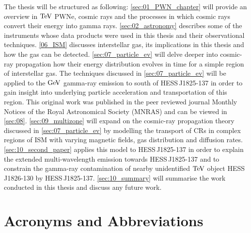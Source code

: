 The thesis will be structured as following:
\autoref{sec:01_PWN_chapter} will provide an overview in $\TeV$ PWNe, cosmic rays and the processes in which cosmic rays convert their energy into gamma rays. \autoref{sec:02_astronomy} describes some of the instruments whose data products were used in this thesis and their observational techniques. \autoref{06_ISM} discusses interstellar gas, its implications in this thesis and how the gas can be detected. \autoref{sec:07_particle_ev} will delve deeper into cosmic-ray propagation how their energy distribution evolves in time for a simple region of interstellar gas. The techniques discussed in \autoref{sec:07_particle_ev} will be applied to the $\si{\giga\electronvolt}$ gamma-ray emission to south of \mbox{HESS\,J1825-137} in order to gain insight into underlying particle acceleration and transportation of this region. This original work was published in the peer reviewed journal Monthly Notices of the Royal Astronomical Society (MNRAS) and can be viewed in \autoref{sec:08}. \autoref{sec:09_multizone} will expand on the cosmic-ray propagation theory discussed in \autoref{sec:07_particle_ev} by modelling the transport of CRs in complex regions of ISM with varying magnetic fields, gas distribution and diffusion rates. \autoref{sec:10_second_paper} applies this model to \mbox{HESS\,J1825-137} in order to explain the extended multi-wavelength emission towards \mbox{HESS\,J1825-137} and to constrain the gamma-ray contamination of nearby unidentified $\TeV$ object \mbox{HESS\,J1826-130} by \mbox{HESS\,J1825-137}. \autoref{sec:10_summary} will summarise the work conducted in this thesis and discuss any future work.

\section*{Acronyms and Abbreviations}

